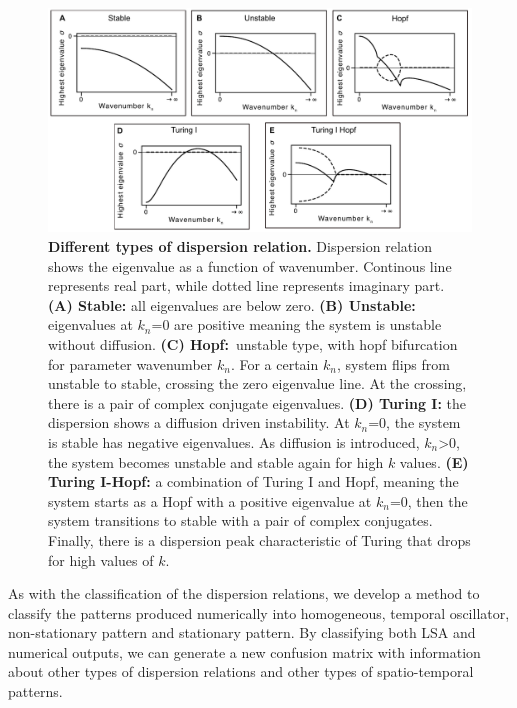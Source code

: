 \begin{figure}[H] %
    \centering
    \includegraphics[width=1\textwidth]{chapters/Chapter 1/dispersions} %
    \caption{\textbf{Different types of dispersion relation.} Dispersion relation shows the eigenvalue as a function of wavenumber. Continous line represents real part, while dotted line represents imaginary part. \textbf{(A) Stable:} all eigenvalues are below zero. \textbf{(B) Unstable:} eigenvalues at $k_{n}$=0 are positive meaning the system is unstable without diffusion. \textbf{(C) Hopf:}~unstable type, with hopf bifurcation for parameter wavenumber $k_{n}$. For a certain $k_{n}$, system flips from unstable to stable, crossing the zero eigenvalue line. At the crossing, there is a pair of complex conjugate eigenvalues. \textbf{(D) Turing I:} the dispersion shows a diffusion driven instability. At $k_{n}$=0, the system is stable has negative eigenvalues. As diffusion is introduced, $k_{n}$>0, the system becomes unstable and stable again for high $k$ values. \textbf{(E) Turing I-Hopf:} a combination of Turing I and Hopf, meaning the system starts as a Hopf with a positive eigenvalue at $k_{n}$=0, then the system transitions to stable with a pair of complex conjugates. Finally, there is a dispersion peak characteristic of Turing that drops for high values of $k$.}
    \label{fig:dispersions} %
\end{figure}

As with the classification of the dispersion relations, we develop a method to classify the patterns produced numerically into homogeneous, temporal oscillator, non-stationary pattern and stationary pattern.
By classifying both LSA and numerical outputs, we can generate a new confusion matrix with information about other types of dispersion relations and other types of spatio-temporal patterns.

